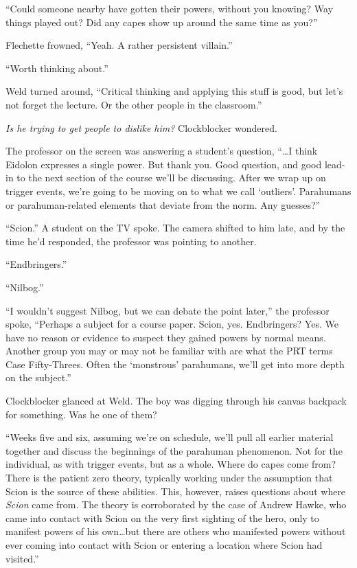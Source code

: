 ``Could someone nearby have gotten their powers, without you knowing?  Way things played out?  Did any capes show up around the same time as you?''



Flechette frowned, ``Yeah.  A rather persistent villain.''



``Worth thinking about.''



Weld turned around, ``Critical thinking and applying this stuff is good, but let's not forget the lecture.  Or the other people in the classroom.''



\emph{Is he trying to get people to dislike him?}  Clockblocker wondered.



The professor on the screen was answering a student's question, ``\ldots{}I think Eidolon expresses a single power.  But thank you.  Good question, and good lead-in to the next section of the course we'll be discussing.  After we wrap up on trigger events, we're going to be moving on to what we call `outliers'.  Parahumans or parahuman-related elements that deviate from the norm.  Any guesses?''



``Scion.'' A student on the TV spoke.  The camera shifted to him late, and by the time he'd responded, the professor was pointing to another.



``Endbringers.''



``Nilbog.''



``I wouldn't suggest Nilbog, but we can debate the point later,'' the professor spoke, ``Perhaps a subject for a course paper.  Scion, yes.  Endbringers?  Yes.  We have no reason or evidence to suspect they gained powers by normal means.  Another group you may or may not be familiar with are what the PRT terms Case Fifty-Threes.  Often the `monstrous' parahumans, we'll get into more depth on the subject.''



Clockblocker glanced at Weld.  The boy was digging through his canvas backpack for something.  Was he one of them?



``Weeks five and six, assuming we're on schedule, we'll pull all earlier material together and discuss the beginnings of the parahuman phenomenon.  Not for the individual, as with trigger events, but as a whole.  Where do capes come from?  There is the patient zero theory, typically working under the assumption that Scion is the source of these abilities.  This, however, raises questions about where \emph{Scion} came from.  The theory is corroborated by the case of Andrew Hawke, who came into contact with Scion on the very first sighting of the hero, only to manifest powers of his own\ldots but there are others who manifested powers without ever coming into contact with Scion or entering a location where Scion had visited.''



